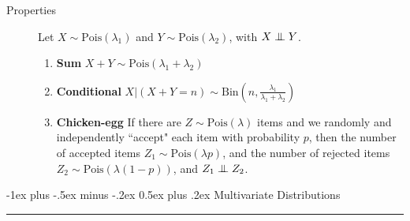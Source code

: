 \documentclass[10pt,landscape]{article}
\makeatletter
\newcommand\independent{\protect\mathpalette{\protect\independenT}{\perp}}
\def\independenT#1#2{\mathrel{\setbox0\hbox{$#1#2$}%
\copy0\kern-\wd0\mkern4mu\box0}}
\newcommand{\Bin}{\textrm{Bin}}
\newcommand{\Pois}{\textrm{Pois}}
\renewcommand{\section}{\@startsection{section}{1}{0mm}%
{-1ex plus -.5ex minus -.2ex}%
{0.5ex plus .2ex}%
{\normalfont\large\bfseries}}
\makeatother
\begin{document}
\begin{multicols*}{3}
\begin{description}
            \item[Properties]
            Let $X \sim \Pois(\lambda_1)$ and $Y \sim \Pois(\lambda_2)$, with $X \independent Y$.

            \begin{enumerate}
                \item \textbf{Sum} $X + Y \sim \Pois(\lambda_1 + \lambda_2)$
                \item \textbf{Conditional} $X | (X + Y = n) \sim \Bin\left(n, \frac{\lambda_1}{\lambda_1 + \lambda_2}\right)$
                \item \textbf{Chicken-egg} If there are $Z \sim \Pois(\lambda)$ items and we randomly and independently ``accept" each item with probability $p$, then the number of accepted items $Z_1 \sim \Pois(\lambda p)$, and the number of rejected items $Z_2 \sim \Pois(\lambda (1-p))$, and $Z_1 \independent Z_2$.
            \end{enumerate}

        \end{description}


        \section{Multivariate Distributions} \smallskip \hrule height 2pt \smallskip


\end{multicols*}
\end{document}

